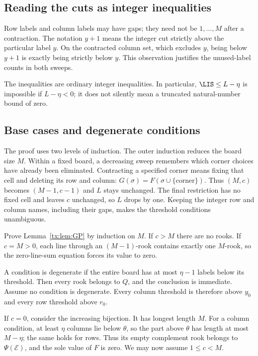 \subsection{Reading the cuts as integer inequalities}
Row labels and column labels may have gaps; they need not be
$1,\ldots,M$ after a contraction. The notation $y+1$ means the
integer cut strictly above the particular label $y$. On the contracted
column set, which excludes $y$, being below $y+1$ is exactly being
strictly below $y$. This observation justifies the unused-label
counts in both sweeps.

The inequalities are ordinary integer inequalities. In particular,
$\LIS\le L-\eta$ is impossible if $L-\eta<0$; it does not silently
mean a truncated natural-number bound of zero.

\subsection{Base cases and degenerate conditions}
The proof uses two levels of induction. The outer induction reduces
the board size $M$. Within a fixed board, a decreasing sweep remembers
which corner choices have already been eliminated. Contracting a
specified corner means fixing that cell and deleting its row and
column: $G(\sigma)=F(\sigma\cup\{\text{corner}\})$.
Thus $(M,c)$ becomes $(M-1,c-1)$ and $L$ stays unchanged. The final
restriction has no fixed cell and leaves $c$ unchanged, so $L$ drops
by one. Keeping the integer row and column names, including their
gaps, makes the threshold conditions unambiguous.

Prove Lemma~\ref{tx:lem:GP} by induction on $M$. If $c>M$ there are no rooks. If $c=M>0$, each line through an $(M-1)$-rook contains exactly one $M$-rook, so the zero-line-sum equation forces its value to zero.

A condition is degenerate if the entire board has at most $\eta-1$ labels below its threshold. Then every rook belongs to $Q$, and the conclusion is immediate. Assume no condition is degenerate. Every column threshold is therefore above $y_0$ and every row threshold above $r_0$.

If $c=0$, consider the increasing bijection. It has longest length $M$. For a column condition, at least $\eta$ columns lie below $\theta$, so the part above $\theta$ has length at most $M-\eta$; the same holds for rows. Thus its empty complement rook belongs to $\Psi(\mathcal E)$, and the sole value of $F$ is zero. We may now assume $1\le c<M$.

